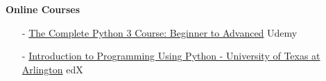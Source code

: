 \documentclass[10pt,a4paper,sans]{moderncv} %
\begin{document}
			
			
			

	 \textbf{Online Courses}
		\begin{itemize}[nosep, leftmargin=0.9cm]
			\item[-] %
			\href{https://www.udemy.com/certificate/UC-3c2dbfa0-4798-43ab-8914-959045a865ee/}{The Complete Python 3 Course: Beginner to Advanced} \hfill Udemy
			\item[-] \href{https://github.com/mohakhalili/MyPy_TinyCodes}{Introduction to Programming Using Python - University of Texas at Arlington} \hfill edX
		\end{itemize}
	
\end{document}
